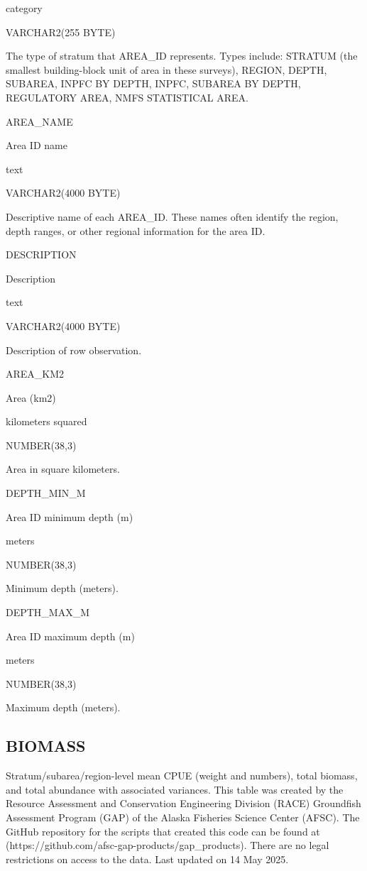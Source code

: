 \documentclass[
  letterpaper,
  oneside,
  open=any]{scrbook}
\begin{document}
category

VARCHAR2(255 BYTE)

The type of stratum that AREA\_ID represents. Types include: STRATUM
(the smallest building-block unit of area in these surveys), REGION,
DEPTH, SUBAREA, INPFC BY DEPTH, INPFC, SUBAREA BY DEPTH, REGULATORY
AREA, NMFS STATISTICAL AREA.

AREA\_NAME

Area ID name

text

VARCHAR2(4000 BYTE)

Descriptive name of each AREA\_ID. These names often identify the
region, depth ranges, or other regional information for the area ID.

DESCRIPTION

Description

text

VARCHAR2(4000 BYTE)

Description of row observation.

AREA\_KM2

Area (km2)

kilometers squared

NUMBER(38,3)

Area in square kilometers.

DEPTH\_MIN\_M

Area ID minimum depth (m)

meters

NUMBER(38,3)

Minimum depth (meters).

DEPTH\_MAX\_M

Area ID maximum depth (m)

meters

NUMBER(38,3)

Maximum depth (meters).

\subsection{BIOMASS}\label{biomass}

Stratum/subarea/region-level mean CPUE (weight and numbers), total
biomass, and total abundance with associated variances. This table was
created by the Resource Assessment and Conservation Engineering Division
(RACE) Groundfish Assessment Program (GAP) of the Alaska Fisheries
Science Center (AFSC). The GitHub repository for the scripts that
created this code can be found at
(https://github.com/afsc-gap-products/gap\_products). There are no legal
restrictions on access to the data. Last updated on 14 May 2025.
\end{document}
